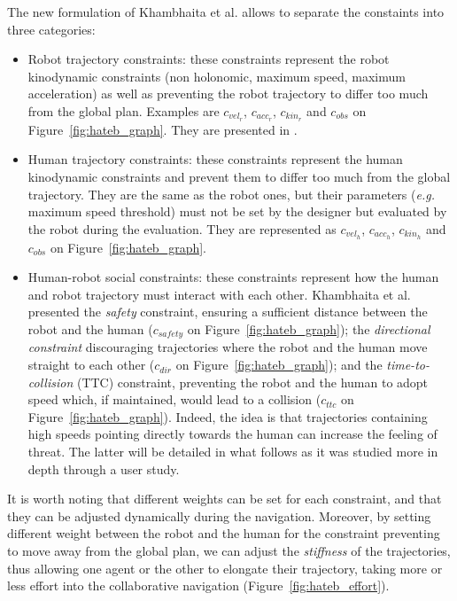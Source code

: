 \documentclass[a4paper,11pt,twoside]{StyleThese}
\begin{document}
The new formulation of Khambhaita et al. allows to separate the constaints into three categories:
\begin{itemize}
\item Robot trajectory constraints: these constraints represent the robot kinodynamic constraints (non holonomic, maximum speed, maximum acceleration) as well as preventing the robot trajectory to differ too much from the global plan. Examples are $c_{vel_{r}}$,  $c_{acc_{r}}$, $c_{kin_{r}}$ and $c_{obs}$ on Figure~\ref{fig:hateb_graph}. They are presented in \cite{rosmann_efficient_2013}.
\item Human trajectory constraints: these constraints represent the human kinodynamic constraints and prevent them to differ too much from the global trajectory. They are the same as the robot ones, but their parameters (\textit{e.g.} maximum speed threshold) must not be set by the designer but evaluated by the robot during the evaluation. They are represented as $c_{vel_{h}}$,  $c_{acc_{h}}$, $c_{kin_{h}}$ and $c_{obs}$ on Figure~\ref{fig:hateb_graph}.
\item Human-robot social constraints: these constraints represent how the human and robot trajectory must interact with each other. Khambhaita et al. presented the \textit{safety} constraint, ensuring a sufficient distance between the robot and the human ($c_{safety}$ on Figure~\ref{fig:hateb_graph}); the \textit{directional constraint} discouraging trajectories where the robot and the human move straight to each other ($c_{dir}$ on Figure~\ref{fig:hateb_graph}); and the \textit{time-to-collision} (TTC) constraint, preventing the robot and the human to adopt speed which, if maintained, would lead to a collision ($c_{ttc}$ on Figure~\ref{fig:hateb_graph}). Indeed, the idea is that trajectories containing high speeds pointing directly towards the human can increase the feeling of threat. The latter will be detailed in what follows as it was studied more in depth through a user study.
\end{itemize}

It is worth noting that different weights can be set for each constraint, and that they can be adjusted dynamically during the navigation. Moreover, by setting different weight between the robot and the human for the constraint preventing to move away from the global plan, we can adjust the \textit{stiffness} of the trajectories, thus allowing one agent or the other to elongate their trajectory, taking more or less effort into the collaborative navigation (Figure~\ref{fig:hateb_effort}).
\end{document}
